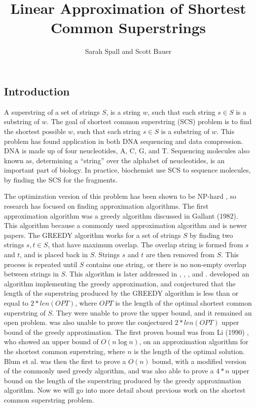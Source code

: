\documentclass[letterpaper,11pt,titlepage]{article}
\title{Linear Approximation of Shortest Common Superstrings}
\author[1]{Sarah Spall and Scott Bauer}
\begin{document}
\maketitle
\newpage

\subsection*{Introduction}
A superstring of a set of strings $S$, is a string $w$, such that each string $s \in S$ is a substring
of $w$.  The goal of shortest common superstring (SCS) problem is to find the shortest possible $w$, such that each 
string $s \in S$ is a substring of $w$. This problem has found application in both DNA sequencing 
and data compression.  DNA is made up of four neucleotides, {A, C, G, and T}.  Sequencing molecules also known as,
determining a ``string'' over the alphabet of neucleotides, is an important part of biology. In practice, biochemist use SCS to sequence molecules, by finding the SCS for the fragments.

The optimization version of this problem has been shown to be NP-hard \cite{blum1991linear} \cite{gallant1980finding}, 
so research has focused on finding approximation algorithms.  The first approximation 
algorithm was a greedy algorithm discussed in Gallant (1982). This algorithm because a commonly used approximation algorithm and is newer papers.  The GREEDY algorithm works for a set of strings $S$ by finding two strings $s,t \in S$, that have maximum overlap.  The overlap string is formed from $s$ and $t$, and  is placed back in $S$.  Strings $s$ and $t$ are then removed from $S$.  This process is repeated until
$S$ contains one string, or there is no non-empty overlap between strings in $S$.  This algorithm is later
addressed in \cite{turner1989approximation}, \cite{tarhio1988greedy}, \cite{li1990towards}, and \cite{blum1991linear}.
\cite{tarhio1988greedy} developed an algorithm implementing the greedy approximation, and conjectured that 
the length of the superstring produced by the GREEDY algorithm is less than or equal to $2*len(OPT)$, where $OPT$ is the length of the optimal shortest common superstring of $S$.  They were unable
to prove the upper bound, and it remained an open problem.  \cite{turner1989approximation} was also unable to prove
the conjectured $2*len(OPT)$ upper bound of the greedy approximation.  The first proven bound was from Li (1990) \cite{li1990towards}, who showed an upper bound of $O(n\log n)$, on an approximation algorithm for the shortest common superstring, where $n$ is the length of the optimal solution. Blum et al. \cite{blum1991linear} was then the first to prove a $O(n)$ bound, with a modified version of the commonly used greedy algorithm, and was also able to prove a $4*n$ upper bound on the length of the superstring produced by the greedy approximation algorithm.  Now we will go into more detail about previous work on the shortest common superstring problem. 
\end{document}
